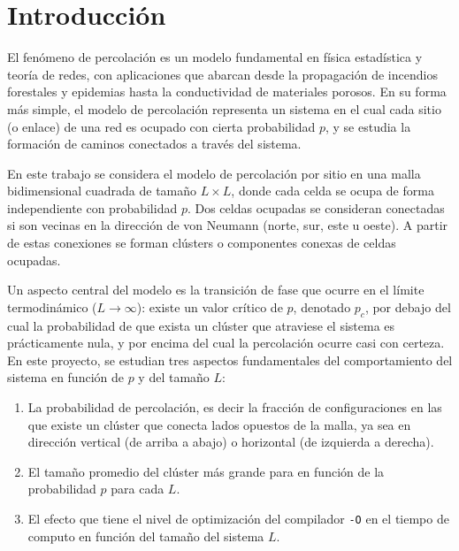 \documentclass[%
 reprint,
 amsmath,amssymb,
 aps,
]{revtex4-2}
\begin{document}
\maketitle

\section{Introducción}

El fenómeno de percolación es un modelo fundamental en física estadística y teoría de redes, con aplicaciones que abarcan desde la propagación de incendios forestales y epidemias hasta la conductividad de materiales porosos. En su forma más simple, el modelo de percolación representa un sistema en el cual cada sitio (o enlace) de una red es ocupado con cierta probabilidad $p$, y se estudia la formación de caminos conectados a través del sistema.

En este trabajo se considera el modelo de percolación por sitio en una malla bidimensional cuadrada de tamaño $L \times L$, donde cada celda se ocupa de forma independiente con probabilidad $p$. Dos celdas ocupadas se consideran conectadas si son vecinas en la dirección de von Neumann (norte, sur, este u oeste). A partir de estas conexiones se forman clústers o componentes conexas de celdas ocupadas.

Un aspecto central del modelo es la transición de fase que ocurre en el límite termodinámico ($L \to \infty$): existe un valor crítico de $p$, denotado $p_c$, por debajo del cual la probabilidad de que exista un clúster que atraviese el sistema es prácticamente nula, y por encima del cual la percolación ocurre casi con certeza. En este proyecto, se estudian tres aspectos fundamentales del comportamiento del sistema en función de $p$ y del tamaño $L$:

\begin{enumerate}
    \item La probabilidad de percolación, es decir la fracción de configuraciones en las que existe un clúster que conecta lados opuestos de la malla, ya sea en dirección vertical (de arriba a abajo) o horizontal (de izquierda a derecha).
    \item El tamaño promedio del clúster más grande para en función de la probabilidad $p$ para cada $L$.
    \item El efecto que tiene el nivel de optimización del compilador \texttt{-O} en el tiempo de computo en función del tamaño del sistema $L$.
\end{enumerate}
\end{document}
